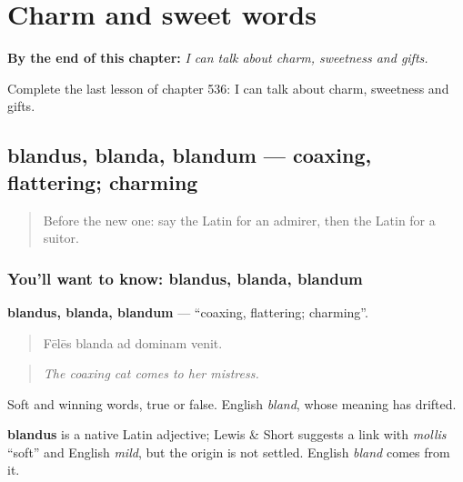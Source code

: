
\chapter{Charm and sweet words}
\label{ch:la-charm-and-sweet-words}

\begin{chapteropening}
\textbf{By the end of this chapter:} \emph{I can talk about charm, sweetness and gifts.}

Complete the last lesson of chapter 536: I can talk about charm, sweetness and gifts.
\end{chapteropening}

\section[blandus, blanda, blandum]{blandus, blanda, blandum — coaxing, flattering; charming}

\label{lesson:LA-C536-blandus}



\begin{quote}
Before the new one: say the Latin for an admirer, then the Latin for a suitor.
\end{quote}

\subsection*{You'll want to know: blandus, blanda, blandum}
\textbf{blandus, blanda, blandum} — \textquotedblleft{}coaxing, flattering; charming\textquotedblright{}.

\begin{quote}
Fēlēs blanda ad dominam venit.
\end{quote}

\begin{quote}
\emph{The coaxing cat comes to her mistress.}
\end{quote}

Soft and winning words, true or false. English \emph{bland}, whose meaning has drifted.

\begin{cousinweb}
\textbf{blandus} is a native Latin adjective; Lewis \& Short suggests a link with \emph{mollis} \textquotedblleft{}soft\textquotedblright{} and English \emph{mild}, but the origin is not settled. English \emph{bland} comes from it.
\end{cousinweb}

